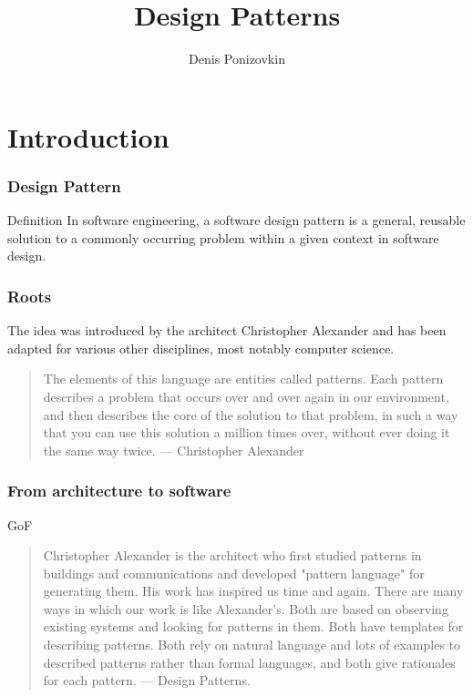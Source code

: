 \documentclass[10pt,xcolor={usenames,dvipsnames}]{beamer}
\begin{document}
\title{Design Patterns}
\author{Denis Ponizovkin} 

\institute[<EPAM>]

\frame{\titlepage} 

\section{Introduction}
\begin{frame}[fragile]
	\frametitle{Design Pattern}
	\begin{exampleblock}{Definition}
	In software engineering, a software design pattern is a general,
	reusable solution to a commonly occurring problem within a given
	context in software design.
	\end{exampleblock}
\end{frame}

\begin{frame}[fragile]
	\frametitle{Roots}
	\begin{exampleblock}{}
		The idea was introduced by the architect Christopher Alexander
		and has been adapted for various other disciplines, most notably
		computer science.
	\end{exampleblock}

	\begin{exampleblock}{}
	\begin{quote}
The elements of this language are entities called patterns. Each pattern describes a problem that occurs over and over again in our environment, and then describes the core of the solution to that problem, in such a way that you can use this solution a million times over, without ever doing it the same way twice. --- Christopher Alexander
	\end{quote}
	\end{exampleblock}
\end{frame}

\begin{frame}[fragile]
	\frametitle{From architecture to software}
	\begin{exampleblock}{GoF}
	\begin{quote}
Christopher Alexander is the architect who first studied patterns in buildings and communications and developed "pattern language" for generating them. His work has inspired us time and again. There are many ways in which our work is like Alexander's. Both are based on observing existing systems and looking for patterns in them. Both have templates for describing patterns. Both rely on natural language and lots of examples to described patterns rather than formal languages, and both give rationales for each pattern. --- Design Patterns.
	\end{quote}
	\end{exampleblock}
\end{frame}
\end{document}
